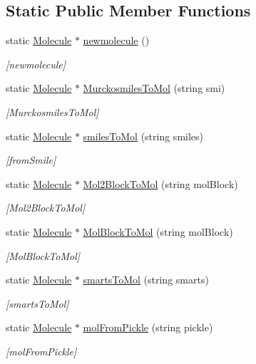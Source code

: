 \subsection*{Static Public Member Functions}
\begin{DoxyCompactItemize}
\item 
static \mbox{\hyperlink{class_molecule}{Molecule}} $\ast$ \mbox{\hyperlink{class_molecule_ab7813a959f80b5291f43f6b84b775ff5}{newmolecule}} ()
\begin{DoxyCompactList}\small\item\em \mbox{[}newmolecule\mbox{]} \end{DoxyCompactList}\item 
static \mbox{\hyperlink{class_molecule}{Molecule}} $\ast$ \mbox{\hyperlink{class_molecule_af46950eda08b8532e75f9bf83a07ead7}{Murckosmiles\+To\+Mol}} (string smi)
\begin{DoxyCompactList}\small\item\em \mbox{[}Murckosmiles\+To\+Mol\mbox{]} \end{DoxyCompactList}\item 
static \mbox{\hyperlink{class_molecule}{Molecule}} $\ast$ \mbox{\hyperlink{class_molecule_a8aa7308d675a16f2513de6c343eb11d3}{smiles\+To\+Mol}} (string smiles)
\begin{DoxyCompactList}\small\item\em \mbox{[}from\+Smile\mbox{]} \end{DoxyCompactList}\item 
static \mbox{\hyperlink{class_molecule}{Molecule}} $\ast$ \mbox{\hyperlink{class_molecule_a689a07968c44db22ef925eee7f70295b}{Mol2\+Block\+To\+Mol}} (string mol\+Block)
\begin{DoxyCompactList}\small\item\em \mbox{[}Mol2\+Block\+To\+Mol\mbox{]} \end{DoxyCompactList}\item 
static \mbox{\hyperlink{class_molecule}{Molecule}} $\ast$ \mbox{\hyperlink{class_molecule_a75b3d11ee3b2ccacad2f5ae1c6909b19}{Mol\+Block\+To\+Mol}} (string mol\+Block)
\begin{DoxyCompactList}\small\item\em \mbox{[}Mol\+Block\+To\+Mol\mbox{]} \end{DoxyCompactList}\item 
static \mbox{\hyperlink{class_molecule}{Molecule}} $\ast$ \mbox{\hyperlink{class_molecule_a628d6859f22b76a102d11674ef461923}{smarts\+To\+Mol}} (string smarts)
\begin{DoxyCompactList}\small\item\em \mbox{[}smarts\+To\+Mol\mbox{]} \end{DoxyCompactList}\item 
static \mbox{\hyperlink{class_molecule}{Molecule}} $\ast$ \mbox{\hyperlink{class_molecule_a2425937fefa34d28560ef4ad152b9602}{mol\+From\+Pickle}} (string pickle)
\begin{DoxyCompactList}\small\item\em \mbox{[}mol\+From\+Pickle\mbox{]} \end{DoxyCompactList}\end{DoxyCompactItemize}


